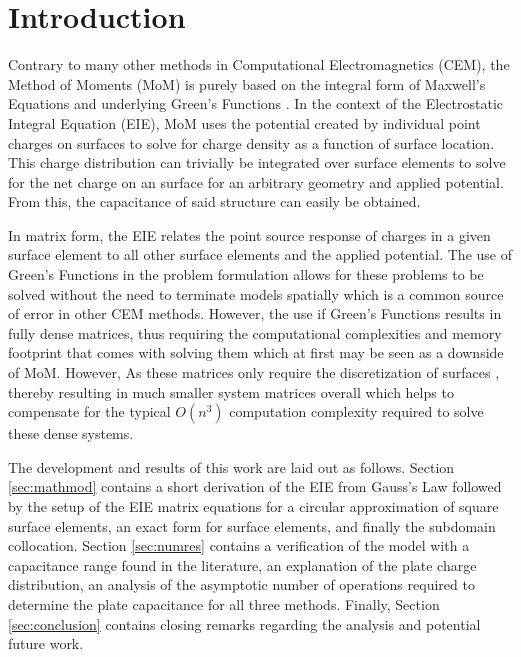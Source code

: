 \section{Introduction}
\label{sec:intro}

Contrary to many other methods in Computational Electromagnetics (CEM), the Method of Moments (MoM) is purely based on the integral form of Maxwell's Equations and underlying Green's Functions \cite{rothlecnotes}. In the context of the Electrostatic Integral Equation (EIE), MoM uses the potential created by individual point charges on surfaces to solve for charge density as a function of surface location. This charge distribution can trivially be integrated over surface elements to solve for the net charge on an surface for an arbitrary geometry and applied potential. From this, the capacitance of said structure can easily be obtained.

In matrix form, the EIE relates the point source response of charges in a given surface element to all other surface elements and the applied potential. The use of Green's Functions in the problem formulation allows for these problems to be solved without the need to terminate models spatially which is a common source of error in other CEM methods. However, the use if Green's Functions results in fully dense matrices, thus requiring the computational complexities and memory footprint that comes with solving them which at first may be seen as a downside of MoM. However, As these matrices only require the discretization of surfaces \cite{rothlecnotes}, \cite{jin2011theory} thereby resulting in much smaller system matrices overall which helps to compensate for the typical $O(n^3)$ computation complexity required to solve these dense systems. 

The development and results of this work are laid out as follows. Section \ref{sec:mathmod} contains a short derivation of the EIE from Gauss's Law followed by the setup of the EIE matrix equations for a circular approximation of square surface elements, an exact form for surface elements, and finally the subdomain collocation. Section \ref{sec:numres} contains a verification of the model with a capacitance range found in the literature, an explanation of the plate charge distribution, an analysis of the asymptotic number of operations required to determine the plate capacitance for all three methods. Finally, Section \ref{sec:conclusion} contains closing remarks regarding the analysis and potential future work.
